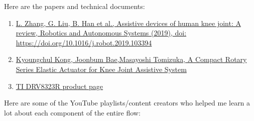 \documentclass[a4paper]{article}
\begin{document}
		Here are the papers and technical documents:
		\begin{enumerate}
			\item\href{https://doi.org/10.1016/j.robot.2019.103394}{L. Zhang, G. Liu, B. Han et al., Assistive devices of human knee joint: A
				review, Robotics and Autonomous Systems (2019), doi:
				https://doi.org/10.1016/j.robot.2019.103394}
			\item \href{https://ieeexplore.ieee.org/document/5509227}{Kyoungchul Kong, Joonbum Bae,Masayoshi Tomizuka, A Compact Rotary Series Elastic Actuator for Knee Joint Assistive System}
			\item \href{https://www.ti.com/product/DRV8323R#tech-docs}{TI DRV8323R product page}
		\end{enumerate}

		Here are some of the YouTube playlists/content creators who helped me learn a lot about each component of the entire flow:
\end{document}
